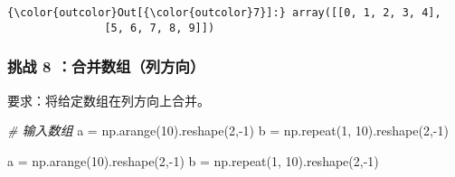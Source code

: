 \documentclass[11pt]{article}
\newenvironment{Shaded}{}{}
\newcommand{\DecValTok}[1]{\textcolor[rgb]{0.25,0.63,0.44}{{#1}}}
\newcommand{\CommentTok}[1]{\textcolor[rgb]{0.38,0.63,0.69}{\textit{{#1}}}}
\newcommand{\NormalTok}[1]{{#1}}
\newcommand{\OperatorTok}[1]{\textcolor[rgb]{0.40,0.40,0.40}{{#1}}}
\begin{document}
\begin{Verbatim}[commandchars=\\\{\}]
{\color{outcolor}Out[{\color{outcolor}7}]:} array([[0, 1, 2, 3, 4],
               [5, 6, 7, 8, 9]])
\end{Verbatim}
            
    \subsubsection{挑战 8
：合并数组（列方向）}\label{ux6311ux6218-8-ux5408ux5e76ux6570ux7ec4ux5217ux65b9ux5411}

要求：将给定数组在列方向上合并。

\begin{Shaded}
\begin{Highlighting}[]
\CommentTok{# 输入数组}
\NormalTok{a }\OperatorTok{=}\NormalTok{ np.arange(}\DecValTok{10}\NormalTok{).reshape(}\DecValTok{2}\NormalTok{,}\OperatorTok{-}\DecValTok{1}\NormalTok{)}
\NormalTok{b }\OperatorTok{=}\NormalTok{ np.repeat(}\DecValTok{1}\NormalTok{, }\DecValTok{10}\NormalTok{).reshape(}\DecValTok{2}\NormalTok{,}\OperatorTok{-}\DecValTok{1}\NormalTok{)}

\NormalTok{a }\OperatorTok{=}\NormalTok{ np.arange(}\DecValTok{10}\NormalTok{).reshape(}\DecValTok{2}\NormalTok{,}\OperatorTok{-}\DecValTok{1}\NormalTok{)}
\NormalTok{b }\OperatorTok{=}\NormalTok{ np.repeat(}\DecValTok{1}\NormalTok{, }\DecValTok{10}\NormalTok{).reshape(}\DecValTok{2}\NormalTok{,}\OperatorTok{-}\DecValTok{1}\NormalTok{)}
\end{Highlighting}
\end{Shaded}
\end{document}
